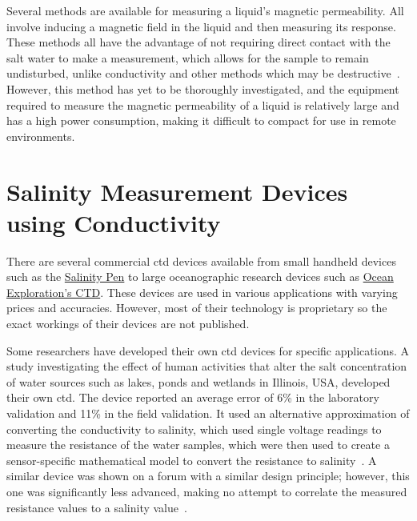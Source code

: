 Several methods are available for measuring a liquid's magnetic permeability. 
All involve inducing a magnetic field in the liquid and then measuring its response.
These methods all have the advantage of not requiring direct contact with the salt water to make a measurement, which allows for the sample to remain undisturbed, unlike conductivity and other methods which may be destructive~\cite{tengesdal_electromagnetic_salinity_2014}.
However, this method has yet to be thoroughly investigated, and the equipment required to measure the magnetic permeability of a liquid is relatively large and has a high power consumption, making it difficult to compact for use in remote environments.

\section{Salinity Measurement Devices using Conductivity}\label{sec:salinity-measurement-devices}

There are several commercial \gls{ctd} devices available from small handheld devices such as the \href{https://euca.co.za/products/salinity-pen?srsltid=AfmBOorAK21_xoeOZbaqoqXbRzrLxF5Yx47nzn7tvsve-_Azl3sSh1-QbIg}{Salinity Pen} to large oceanographic research devices such as \href{https://oceanexplorer.noaa.gov/technology/ctd/ctd.html}{Ocean Exploration's CTD}.
These devices are used in various applications with varying prices and accuracies. 
However, most of their technology is proprietary so the exact workings of their devices are not published.

Some researchers have developed their own \gls{ctd} devices for specific applications.
A study investigating the effect of human activities that alter the salt concentration of water sources such as lakes, ponds and wetlands in Illinois, USA, developed their own \gls{ctd}.
The device reported an average error of 6\% in the laboratory validation and 11\% in the field validation.
It used an alternative approximation of converting the conductivity to salinity, which used single voltage readings to measure the resistance of the water samples, which were then used to create a sensor-specific mathematical model to convert the resistance to salinity~\cite{benjankar_ec_based_salt_measurement_2021}.
A similar device was shown on a forum with a similar design principle; however, this one was significantly less advanced, making no attempt to correlate the measured resistance values to a salinity value~\cite{instructables_water_salinity_meter}.

